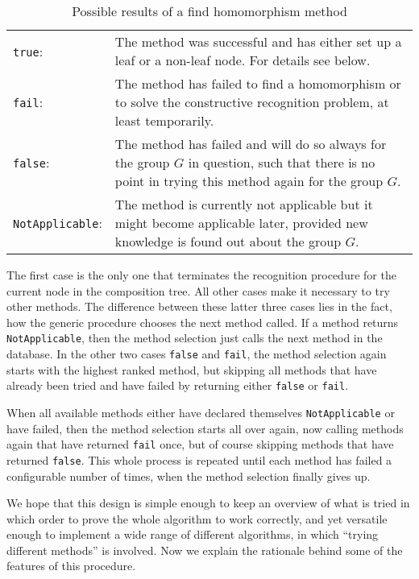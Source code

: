 \begin{table}[ht]
\begin{tabular}{lp{4in}}
\texttt{true}: &
   The method was successful and has either set up a
   leaf or a non-leaf node. For details see below. \\
\texttt{fail}: &
   The method has failed to find a homomorphism or
   to solve the constructive recognition problem, at least temporarily. \\
\texttt{false}: &
   The method has failed and will do so always for
   the group $G$ in question, such that there is no point in trying
   this method again for the group $G$. \\
\texttt{NotApplicable}: &
   The method is currently not applicable
   but it might become applicable later, provided new knowledge is
   found out about the group $G$.
\end{tabular}
\caption{Possible results of a find homomorphism method}
\label{methselresults}
\end{table}

The first case is the only one that terminates the recognition procedure
for the current node in the composition tree.
All other cases make it necessary to try other methods. The difference
between these latter three cases lies in the fact, how the generic
procedure chooses the next method called. If a method returns
\texttt{NotApplicable}, then the method selection just calls the next
method in the database. In the other two cases \texttt{false} and 
\texttt{fail}, the method selection again starts with the highest ranked
method, but skipping all methods that have already been tried and
have failed by returning either \texttt{false} or \texttt{fail}.

When all available methods either have declared themselves
\texttt{NotApplicable} or have failed, then the method selection 
starts all over again, now calling methods again that have returned
\texttt{fail} once, but of course skipping methods that have returned
\texttt{false}. This whole process is repeated until each method has
failed a configurable number of times, when the method selection
finally gives up.

We hope that this design is simple enough to keep an overview of what is
tried in which order to prove the whole algorithm to work correctly,
and yet versatile enough to implement a wide range of different algorithms,
in which ``trying different methods'' is involved. Now we explain
the rationale behind some of the features of this procedure.

